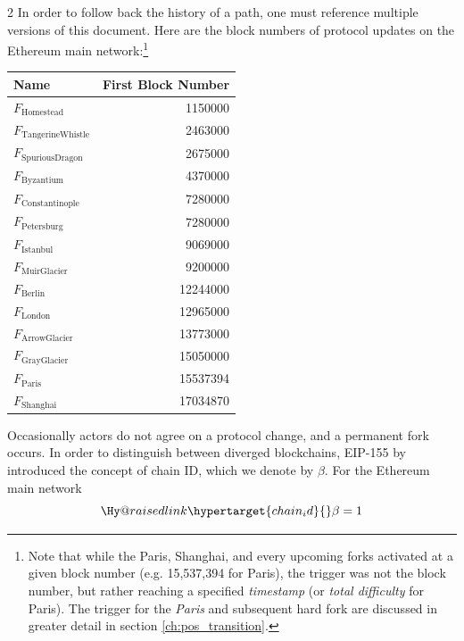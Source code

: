 \documentclass[9pt,oneside]{amsart}
\makeatletter
\newcommand{\linkdest}[1]{\Hy@raisedlink{\hypertarget{#1}{}}}
\makeatother
\begin{document}
\begin{multicols}{2}
In order to follow back the history of a path, one must reference multiple versions of this document.
Here are the block numbers of protocol updates on the Ethereum main network:\footnote{Note that while the Paris, Shanghai, and every upcoming forks activated at a given block number (e.g. 15,537,394 for Paris), the trigger was not the block number, but rather reaching a specified \textit{timestamp} (or \textit{total difficulty} for Paris). The trigger for the \textit{Paris} and subsequent hard fork are discussed in greater detail in section \ref{ch:pos_transition}.}
\par
\begin{center}
\begin{tabular}{lr}
\toprule
Name & First Block Number \\
\midrule
$F_{\mathrm{Homestead}}$         &  1150000 \\
$F_{\mathrm{Tangerine Whistle}}$ &  2463000 \\
$F_{\mathrm{Spurious Dragon}}$   &  2675000 \\
$F_{\mathrm{Byzantium}}$         &  4370000 \\
$F_{\mathrm{Constantinople}}$    &  7280000 \\
$F_{\mathrm{Petersburg}}$        &  7280000 \\
$F_{\mathrm{Istanbul}}$          &  9069000 \\
$F_{\mathrm{Muir Glacier}}$      &  9200000 \\
$F_{\mathrm{Berlin}}$            & 12244000 \\
$F_{\mathrm{London}}$            & 12965000 \\
$F_{\mathrm{Arrow Glacier}}$     & 13773000 \\
$F_{\mathrm{Gray Glacier}}$      & 15050000 \\
$F_{\mathrm{Paris}}$             & 15537394 \\
$F_{\mathrm{Shanghai}}$          & 17034870 \\
\bottomrule
\end{tabular}
\end{center}
\par

Occasionally actors do not agree on a protocol change, and a permanent fork occurs.
In order to distinguish between diverged blockchains, EIP-155 by \cite{EIP-155} introduced the concept of chain ID, which we denote by $\beta$.
For the Ethereum main network
\begin{equation}
  \linkdest{chain_id}
  \beta = 1
\end{equation}


\end{multicols}
\end{document}
